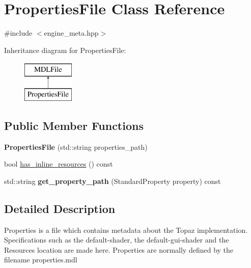 \hypertarget{class_properties_file}{}\section{Properties\+File Class Reference}
\label{class_properties_file}


{\ttfamily \#include $<$engine\+\_\+meta.\+hpp$>$}

Inheritance diagram for Properties\+File\+:\begin{figure}[H]
\begin{center}
\leavevmode
\includegraphics[height=2.000000cm]{class_properties_file}
\end{center}
\end{figure}
\subsection*{Public Member Functions}
\begin{DoxyCompactItemize}
\item 
\mbox{\label{class_properties_file_a4e390d378d937c0414402f1b48a9fd39}} 
{\bfseries Properties\+File} (std\+::string properties\+\_\+path)
\item 
bool \mbox{\hyperlink{class_properties_file_a9d0632fbdef9f881c065b49d0b4bc7e9}{has\+\_\+inline\+\_\+resources}} () const
\item 
\mbox{\label{class_properties_file_aab2a9a8eeaa90367ac6e43d025f684d4}} 
std\+::string {\bfseries get\+\_\+property\+\_\+path} (Standard\+Property property) const
\end{DoxyCompactItemize}


\subsection{Detailed Description}
Properties is a file which contains metadata about the Topaz implementation. Specifications such as the default-\/shader, the default-\/gui-\/shader and the Resources location are made here. Properties are normally defined by the filename \textquotesingle{}properties.\+mdl\textquotesingle{} 

